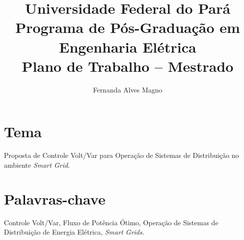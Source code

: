 \documentclass[]{IEEEphot}
\title{Universidade Federal do Pará\\Programa de Pós-Graduação em Engenharia Elétrica\\Plano de Trabalho – Mestrado}
\begin{document}
\author{Fernanda Alves Magno}


\maketitle




	\section{Tema}
Proposta de Controle Volt/Var para Operação de Sistemas de Distribuição no ambiente \textit{Smart Grid}.

\section{Palavras-chave}
Controle Volt/Var, Fluxo de Potência Ótimo, Operação de Sistemas de Distribuição de Energia Elétrica, \textit{Smart Grids}.
\end{document}
